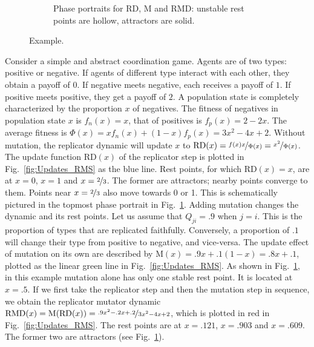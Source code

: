 \documentclass[a4paper, 11pt]{article}
\theoremstyle{Satz}
\begin{document}
\begin{figure}[t]
\begin{subfigure}[b]{0.5\textwidth}
        


    \caption{Phase portraits for RD, M and RMD: unstable rest points are hollow, attractors are
      solid.}
        \label{fig:Phase_RD}
    \end{subfigure}

  \caption{Example.}
  \label{fig:Example_RMD}
\end{figure}


Consider a simple and abstract coordination game. Agents are of two types: positive or
negative. If agents of different type interact with each other, they obtain a payoff of $0$. If
negative meets negative, each receives a payoff of $1$. If positive meets positive, they get a
payoff of $2$.  A population state is completely characterized by the proportion $x$ of
negatives. The fitness of negatives in population state $x$ is $f_n(x) = x$, that of positives
is $f_p(x) = 2-2x$.  The average fitness is
$\Phi(x) = x f_n(x) + (1-x) f_p(x) = 3x^2 - 4x + 2$. Without mutation, the replicator dynamic
will update $x$ to $\text{RD}(x) = \nicefrac{f(x)x}{\Phi(x)} = \nicefrac{x^2}{\Phi(x)}$. The
update function $\text{RD}(x)$ of the replicator step is plotted in Fig.~\ref{fig:Updates_RMS}
as the blue line. Rest points, for which $\text{RD}(x)=x$, are at $x=0$, $x=1$ and
$x= \nicefrac{2}{3}$.  The former are attractors; nearby points converge to them. Points near
$x=\nicefrac{2}{3}$ also move towards 0 or 1. This is schematically pictured in the topmost
phase portrait in Fig.~\ref{fig:Phase_RD}. Adding mutation changes the dynamic and its rest
points. Let us assume that $Q_{ji} = .9$ when $j=i$. This is the proportion of types that are
replicated faithfully. Conversely, a proportion of $.1$ will change their type from positive to
negative, and vice-versa. The update effect of mutation on its own are described by
$\text{M}(x) = .9 x + .1 (1-x) = .8x + .1$, plotted as the linear green line in
Fig.~\ref{fig:Updates_RMS}. As shown in Fig.~\ref{fig:Phase_RD}, in this example mutation alone
has only one stable rest point. It is located at $x = .5$. If we first take the replicator step
and then the mutation step in sequence, we obtain the replicator mutator dynamic
$\text{RMD}(x) = \text{M}(\text{RD}(x)) = \nicefrac{.9x^2 - .2x +.2}{3x^2 - 4x + 2}$, which is
plotted in red in Fig.~\ref{fig:Updates_RMS}. The rest points are at $x=.121$, $x=.903$ and
$x=.609$. The former two are attractors (see Fig.~\ref{fig:Phase_RD}).
\end{document}
